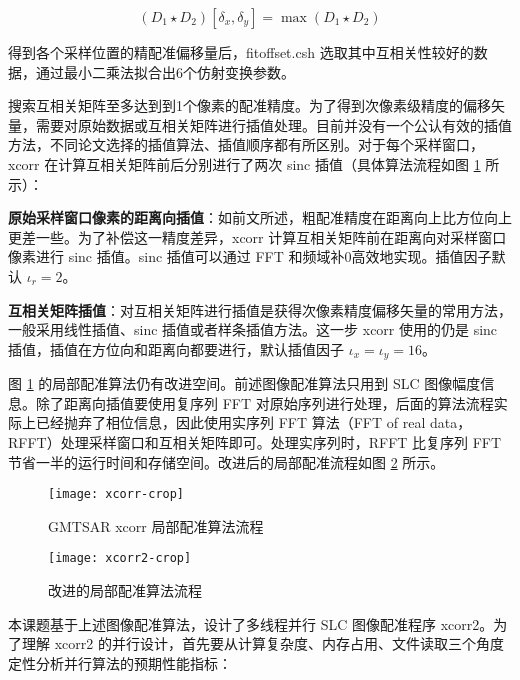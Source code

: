 \begin{equation}
    (D_1 \star D_2)[\delta_x, \delta_y] = \max(D_1 \star D_2)
\end{equation}

得到各个采样位置的精配准偏移量后，fitoffset.csh 选取其中互相关性较好的数据，通过最小二乘法拟合出6个仿射变换参数。

搜索互相关矩阵至多达到到1个像素的配准精度。为了得到次像素级精度的偏移矢量，需要对原始数据或互相关矩阵进行插值处理。目前并没有一个公认有效的插值方法，不同论文选择的插值算法、插值顺序都有所区别\cite{li2008image}\cite{hanssen1999evaluation}。对于每个采样窗口，xcorr 在计算互相关矩阵前后分别进行了两次 sinc 插值（具体算法流程如图 \ref{fig:xcorr} 所示）：

\textbf{原始采样窗口像素的距离向插值}：如前文所述，粗配准精度在距离向上比方位向上更差一些。为了补偿这一精度差异，xcorr 计算互相关矩阵前在距离向对采样窗口像素进行 sinc 插值。sinc 插值可以通过 FFT 和频域补0高效地实现。插值因子默认 $\iota_r = 2$。

\textbf{互相关矩阵插值}：对互相关矩阵进行插值是获得次像素精度偏移矢量的常用方法，一般采用线性插值、sinc 插值或者样条插值方法\cite{hanssen1999evaluation}。这一步 xcorr 使用的仍是 sinc 插值，插值在方位向和距离向都要进行，默认插值因子 $\iota_x = \iota_y = 16$。

图 \ref{fig:xcorr} 的局部配准算法仍有改进空间。前述图像配准算法只用到 SLC 图像幅度信息。除了距离向插值要使用复序列 FFT 对原始序列进行处理，后面的算法流程实际上已经抛弃了相位信息，因此使用实序列 FFT 算法（FFT of real data，RFFT）处理采样窗口和互相关矩阵即可。处理实序列时，RFFT 比复序列 FFT 节省一半的运行时间和存储空间。改进后的局部配准流程如图 \ref{fig:xcorr2} 所示。

\begin{figure}[htbp]
\centering
\texttt{[image: xcorr-crop]}
\caption{GMTSAR xcorr 局部配准算法流程} \label{fig:xcorr}
\end{figure}

\begin{figure}[htbp]
\centering
\texttt{[image: xcorr2-crop]}
\caption{改进的局部配准算法流程}
\label{fig:xcorr2}
\end{figure}

本课题基于上述图像配准算法，设计了多线程并行 SLC 图像配准程序 xcorr2。为了理解 xcorr2 的并行设计，首先要从计算复杂度、内存占用、文件读取三个角度定性分析并行算法的预期性能指标：

